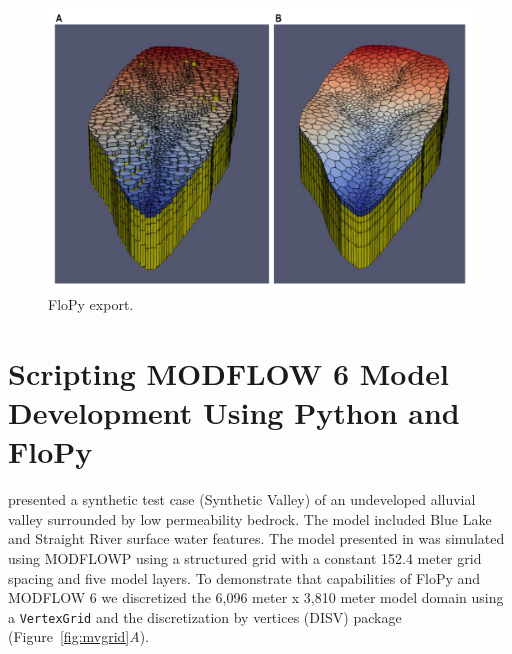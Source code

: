 \documentclass[11pt, oneside]{article}  	%
\begin{document}
\begin{figure}[ht!]
	\begin{center}
		\includegraphics{figures/mf6vtk.pdf}
	\end{center}
	\caption{FloPy export.}
	\label{fig:flopyvtk}
\end{figure}


\section{Scripting MODFLOW 6 Model Development Using Python and FloPy}

\citep{hill1998} presented a synthetic test case (Synthetic Valley) of an undeveloped alluvial valley surrounded by low permeability bedrock. The model included Blue Lake and Straight River surface water features. The model presented in \cite{hill1998} was simulated using MODFLOWP \citep{hill1992computer} using a structured grid with a constant 152.4 meter grid spacing and five model layers. To demonstrate that capabilities of FloPy and MODFLOW 6 we discretized the 6,096 meter x 3,810 meter model domain using a \texttt{VertexGrid} and the discretization by vertices (DISV) package (Figure~\ref{fig:mvgrid}\textit{A}).

\end{document}
